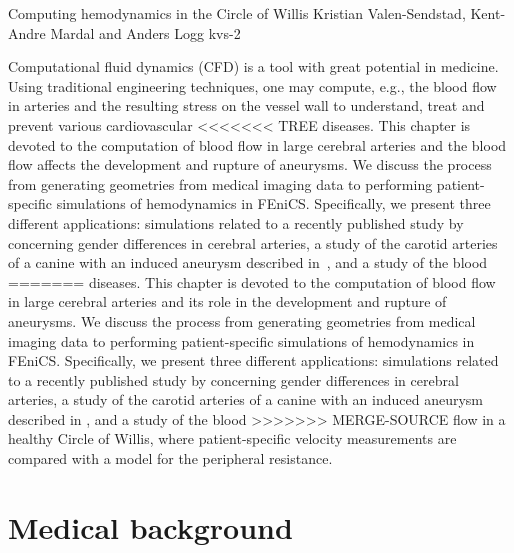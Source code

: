               {Computing hemodynamics in the Circle of Willis}
              {Kristian Valen-Sendstad, Kent-Andre Mardal and Anders Logg}
              {kvs-2}

Computational fluid dynamics (CFD) is a tool with great potential in
medicine. Using traditional engineering techniques, one may compute,
e.g., the blood flow in arteries and the resulting stress on the
vessel wall to understand, treat and prevent various cardiovascular
<<<<<<< TREE
diseases. This chapter is devoted to the computation of blood flow in
large cerebral arteries and the blood flow affects the development
and rupture of
aneurysms. We discuss the process from generating geometries from
medical imaging data to performing patient-specific simulations of
hemodynamics in FEniCS.  Specifically, we present three different
applications: simulations related to a recently published study
by~\citet{LindekleivValen-SendstadMorganEtAl2010} concerning gender
differences in cerebral arteries, a study of the carotid arteries of a
canine with an induced aneurysm described
in~\citet{JiangJohnsonValen-SendstadEtAl2010}, and a study of the blood
=======
diseases. This chapter is devoted to the computation of blood
flow in large cerebral arteries and its role in the development
and rupture of aneurysms. We discuss the process from generating
geometries from medical imaging data to performing patient-specific
simulations of hemodynamics in FEniCS.  Specifically, we present
three different applications: simulations related to a recently
published study by \citet{LindekleivValen-SendstadMorganEtAl2010}
concerning gender differences in cerebral arteries, a study of
the carotid arteries of a canine with an induced aneurysm described
in \citet{JiangJohnsonValen-SendstadEtAl2010}, and a study of the blood
>>>>>>> MERGE-SOURCE
flow in a healthy Circle of Willis, where patient-specific velocity
measurements are compared with a model for the peripheral resistance.

\section{Medical background} \label{Medical_Background}

